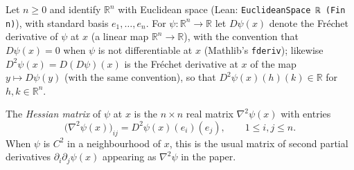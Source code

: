 \begin{definition}
Let $n\ge 0$ and identify $\mathbb R^n$ with Euclidean space (Lean: \texttt{EuclideanSpace ℝ (Fin n)}), with standard basis $e_1,\dots,e_n$. For $\psi:\mathbb R^n\to\mathbb R$ let $D\psi(x)$ denote the Fr\'echet derivative of $\psi$ at $x$ (a linear map $\mathbb R^n\to\mathbb R$), with the convention that $D\psi(x)=0$ when $\psi$ is not differentiable at $x$ (Mathlib's \texttt{fderiv}); likewise $D^2\psi(x)=D(D\psi)(x)$ is the Fr\'echet derivative at $x$ of the map $y\mapsto D\psi(y)$ (with the same convention), so that $D^2\psi(x)(h)(k)\in\mathbb R$ for $h,k\in\mathbb R^n$.

The \emph{Hessian matrix} of $\psi$ at $x$ is the $n\times n$ real matrix $\nabla^2\psi(x)$ with entries
\[
\bigl(\nabla^2\psi(x)\bigr)_{ij}=D^2\psi(x)(e_i)(e_j),\qquad 1\le i,j\le n .
\]
When $\psi$ is $C^2$ in a neighbourhood of $x$, this is the usual matrix of second partial derivatives $\partial_i\partial_j\psi(x)$ appearing as $\nabla^2\psi$ in the paper.
\end{definition}
